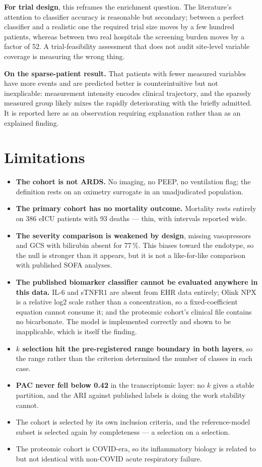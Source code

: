 \documentclass[11pt,letterpaper]{article}
\begin{document}
\textbf{For trial design}, this reframes the enrichment question. The literature's attention
to classifier accuracy is reasonable but secondary; between a perfect classifier and a
realistic one the required trial size moves by a few hundred patients, whereas between two
real hospitals the screening burden moves by a factor of 52. A trial-feasibility assessment
that does not audit site-level variable coverage is measuring the wrong thing.

\textbf{On the sparse-patient result.} That patients with fewer measured variables have more
events and are predicted better is counterintuitive but not inexplicable: measurement
intensity encodes clinical trajectory, and the sparsely measured group likely mixes the
rapidly deteriorating with the briefly admitted. It is reported here as an observation
requiring explanation rather than as an explained finding.

\section{Limitations}

\begin{itemize}
\setlength{\itemsep}{1pt}
\item \textbf{The cohort is not ARDS.} No imaging, no PEEP, no ventilation flag; the
      definition rests on an oximetry surrogate in an unadjudicated population.
\item \textbf{The primary cohort has no mortality outcome.} Mortality rests entirely on 386
      eICU patients with 93 deaths --- thin, with intervals reported wide.
\item \textbf{The severity comparison is weakened by design}, missing vasopressors and GCS
      with bilirubin absent for 77\,\%. This biases toward the endotype, so the null is
      stronger than it appears, but it is not a like-for-like comparison with published SOFA
      analyses.
\item \textbf{The published biomarker classifier cannot be evaluated anywhere in this data.}
      IL-6 and sTNFR1 are absent from EHR data entirely; Olink NPX is a relative log2 scale
      rather than a concentration, so a fixed-coefficient equation cannot consume it; and the
      proteomic cohort's clinical file contains no bicarbonate. The model is implemented
      correctly and shown to be inapplicable, which is itself the finding.
\item \textbf{$k$ selection hit the pre-registered range boundary in both layers}, so the
      range rather than the criterion determined the number of classes in each case.
\item \textbf{PAC never fell below 0.42} in the transcriptomic layer: no $k$ gives a stable
      partition, and the ARI against published labels is doing the work stability cannot.
\item The cohort is selected by its own inclusion criteria, and the reference-model subset is
      selected again by completeness --- a selection on a selection.
\item The proteomic cohort is COVID-era, so its inflammatory biology is related to but not
      identical with non-COVID acute respiratory failure.
\end{itemize}
\end{document}
